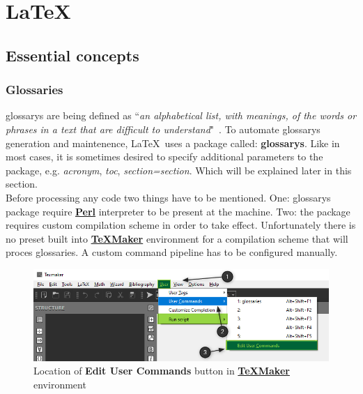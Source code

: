 \part{\LaTeX}

\chapter{Essential concepts}

\section{Glossaries} \label{section:glossaries}

\Glspl{glossary} are being defined as ``\textit{an alphabetical list, with meanings, of the words or phrases in a text that are difficult to understand}"~\cite{cambridge_dictionary_glossary_definition}. To automate \glspl{glossary} generation and maintenence, \LaTeX\ uses a package called: \textbf{\glspl{glossary}}. Like in most cases, it is sometimes desired to specify additional \glspl{parameter} to the package, e.g. \textit{acronym}, \textit{toc}, \textit{section=section}. Which will be explained later in this section.\\

Before processing any code two things have to be mentioned. One: \glspl{glossary} package require \textbf{\href{https://www.perl.org/}{Perl}} interpreter to be present at the machine. Two: the package requires custom compilation scheme in order to take effect. Unfortunately there is no preset built into \textbf{\href{https://www.xm1math.net/texmaker/}{TeXMaker}} environment for a compilation scheme that will proces glossaries. A custom command \gls{pipeline} has to be configured manually.

\begin{figure}[H]
\centering
\includegraphics[scale=0.6]{content/LaTeX/figures/user_command_glossaries_marked.png}
\caption{Location of \textbf{Edit User Commands} button in \textbf{\href{https://www.xm1math.net/texmaker/}{TeXMaker}} environment}
\end{figure}

